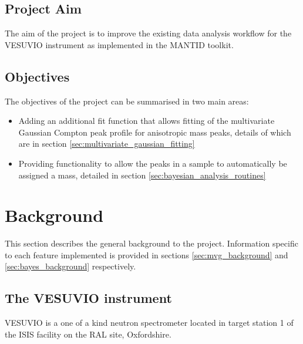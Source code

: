 \documentclass[a4paper]{article}
\begin{document}
\subsection{Project Aim}
\label{sec:project_aim}

The aim of the project is to improve the existing data analysis workflow for the
VESUVIO instrument as implemented in the \gls*{MANTID} toolkit.

\subsection{Objectives}
\label{sec:objectives}

The objectives of the project can be summarised in two main areas:

\begin{itemize}
  \item
    Adding an additional fit function that allows fitting of the multivariate
    Gaussian Compton peak profile for anisotropic mass peaks, details of which
    are in section \ref{sec:multivariate_gaussian_fitting}

  \item
    Providing functionality to allow the peaks in a sample to automatically be
    assigned a mass, detailed in section \ref{sec:bayesian_analysis_routines}
\end{itemize}

\section{Background}
\label{sec:background}

This section describes the general background to the project. Information
specific to each feature implemented is provided in sections
\ref{sec:mvg_background} and \ref{sec:bayes_background} respectively.

\subsection{The VESUVIO instrument}
\label{sec:the_vesuvio_instrument}

VESUVIO is a one of a kind neutron spectrometer located in target station 1 of
the ISIS facility on the \gls*{RAL} site, Oxfordshire.
\end{document}
